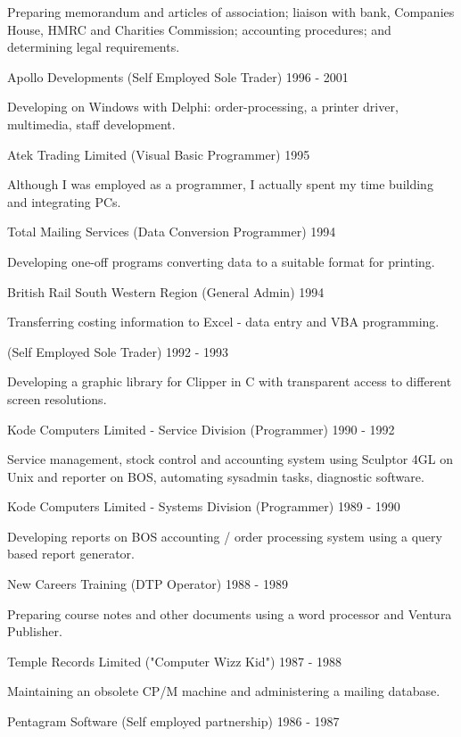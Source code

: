 Preparing memorandum and articles of association;
liaison with bank, Companies House, HMRC and Charities Commission;
accounting procedures; and determining legal requirements.

\jobHeading
    {Apollo Developments (Self Employed Sole Trader)}
    {1996 - 2001}

Developing on Windows with Delphi:
order-processing, a printer driver, multimedia, staff development.

\jobHeading
    {Atek Trading Limited (Visual Basic Programmer)}
    {1995}

Although I was employed as a programmer,
I actually spent my time building and integrating PCs.

\jobHeading
    {Total Mailing Services (Data Conversion Programmer)}
    {1994}

Developing one-off programs converting data to a suitable format for printing.

\jobHeading
    {British Rail South Western Region (General Admin)}
    {1994}

Transferring costing information to Excel - data entry and VBA programming.

\jobHeading
    {(Self Employed Sole Trader)}
    {1992 - 1993}

Developing a graphic library for Clipper in C
with transparent access to different screen resolutions.

\jobHeading
    {Kode Computers Limited - Service Division (Programmer)}
    {1990 - 1992}

Service management, stock control and accounting system using
Sculptor 4GL on Unix and reporter on BOS,
automating sysadmin tasks,
diagnostic software.

\jobHeading
    {Kode Computers Limited - Systems Division (Programmer)}
    {1989 - 1990}

Developing reports on BOS accounting / order processing system
using a query based report generator.

\jobHeading
    {New Careers Training (DTP Operator)}
    {1988 - 1989}

Preparing course notes and other documents
using a word processor and Ventura Publisher.

\jobHeading
    {Temple Records Limited ("Computer Wizz Kid")}
    {1987 - 1988}

Maintaining an obsolete CP/M machine and administering a mailing database.

\jobHeading
    {Pentagram Software (Self employed partnership)}
    {1986 - 1987}

